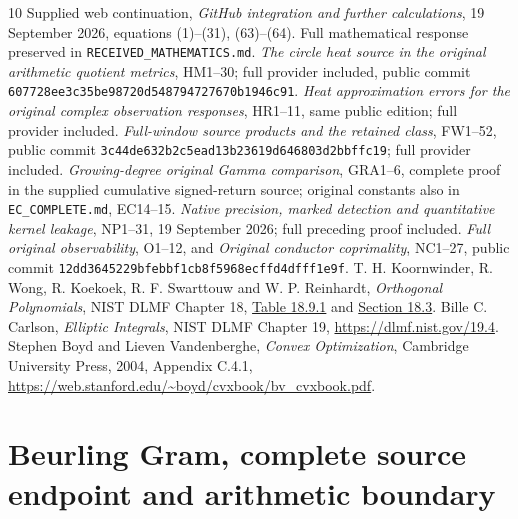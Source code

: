\documentclass[11pt]{article}
\begin{document}
\begin{thebibliography}{10}
 Supplied web continuation, \emph{GitHub integration and further
calculations}, 19 September 2026, equations (1)--(31), (63)--(64).
Full mathematical response preserved in \texttt{RECEIVED\_MATHEMATICS.md}.
 \emph{The circle heat source in the original arithmetic quotient
metrics}, HM1--30; full provider included, public commit
\texttt{607728ee3c35be98720d548794727670b1946c91}.
 \emph{Heat approximation errors for the original complex
observation responses}, HR1--11, same public edition; full provider included.
 \emph{Full-window source products and the retained class},
FW1--52, public commit \texttt{3c44de632b2c5ead13b23619d646803d2bbffc19};
full provider included.
 \emph{Growing-degree original Gamma comparison}, GRA1--6,
complete proof in the supplied cumulative signed-return source;
original constants also in \texttt{EC\_COMPLETE.md}, EC14--15.
 \emph{Native precision, marked detection and quantitative kernel
leakage}, NP1--31, 19 September 2026; full preceding proof included.
 \emph{Full original observability}, O1--12, and
\emph{Original conductor coprimality}, NC1--27, public commit
\texttt{12dd3645229bfebbf1cb8f5968ecffd4dfff1e9f}.
 T. H. Koornwinder, R. Wong, R. Koekoek, R. F. Swarttouw
and W. P. Reinhardt, \emph{Orthogonal Polynomials}, NIST DLMF Chapter 18,
\href{https://dlmf.nist.gov/18.9.T1}{Table 18.9.1} and
\href{https://dlmf.nist.gov/18.3}{Section 18.3}.
 Bille C. Carlson, \emph{Elliptic Integrals}, NIST DLMF
Chapter 19, \url{https://dlmf.nist.gov/19.4}.
 Stephen Boyd and Lieven Vandenberghe,
\emph{Convex Optimization}, Cambridge University Press, 2004, Appendix C.4.1,
\url{https://web.stanford.edu/~boyd/cvxbook/bv_cvxbook.pdf}.
\end{thebibliography}

\endgroup

\clearpage

\begingroup
\providecommand{\C}{\mathbb C}\providecommand{\R}{\mathbb R}
\providecommand{\M}{\mathcal M}\providecommand{\G}{\mathsf G}
\providecommand{\U}{\mathsf U}\providecommand{\E}{\mathsf E}
\newtheorem{egtheorem}{Theorem}
\newtheorem{egproposition}{Proposition}
\newtheorem{eglemma}{Lemma}
\providecommand{\spec}{\operatorname{spec}}\providecommand{\Tr}{\operatorname{Tr}}
\part*{Beurling Gram, complete source endpoint and arithmetic boundary}
\end{document}
